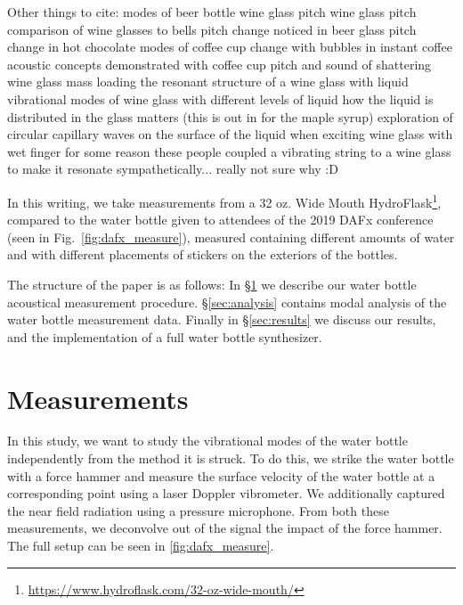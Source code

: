 \documentclass[twoside,a4paper]{article}
\begin{document}
Other things to cite: 
\cite{russelBEER} modes of beer bottle
\cite{french1983vino} wine glass pitch
\cite{chen2005does} wine glass pitch
\cite{rossing1990wine} comparison of wine glasses to bells
\cite{bragg1921world} pitch change noticed in beer glass
\cite{crawford1982hot} pitch change in hot chocolate
\cite{morrison2002sound} modes of coffee cup change with bubbles in instant coffee %
\cite{morrison2014acoustics} acoustic concepts demonstrated with coffee cup
\cite{thines2012wine} pitch and sound of shattering wine glass
\cite{piacsek2015glass} mass loading the resonant structure of a wine glass with liquid
\cite{jundt2006vibrational} vibrational modes of wine glass with different levels of liquid
\cite{courtois2008tuning} how the liquid is distributed in the glass matters (this is out in for the maple syrup)
\cite{apfel1982whispering} exploration of circular capillary waves on the surface of the liquid when exciting wine glass with wet finger
\cite{arbel2017wine} for some reason these people coupled a vibrating string to a wine glass to make it resonate sympathetically... really not sure why :D



In this writing, we take measurements from a 32 oz. Wide Mouth
HydroFlask\footnote{\url{https://www.hydroflask.com/32-oz-wide-mouth/}},
compared to the water bottle given to attendees of the 2019 DAFx
conference (seen in Fig.~\ref{fig:dafx_measure}), measured containing different amounts of water and with different placements of stickers on the exteriors of the
bottles.

The structure of the paper is as follows: In \S\ref{sec:measure} we describe
our water bottle acoustical measurement procedure. \S\ref{sec:analysis}
contains modal analysis of the water bottle measurement data.
Finally in \S\ref{sec:results} we discuss our results, and the
implementation of a full water bottle synthesizer.

\section{Measurements} \label{sec:measure}
%
In this study, we want to study the vibrational modes of the water bottle independently from the method it is struck. To do this, we strike the water bottle with a force hammer and measure the surface velocity of the water bottle at a corresponding point using a laser Doppler vibrometer. We additionally captured the near field radiation using a pressure microphone. From both these measurements, we deconvolve out of the signal the impact of the force hammer. The full setup can be seen in \cref{fig:dafx_measure}.
\end{document}
